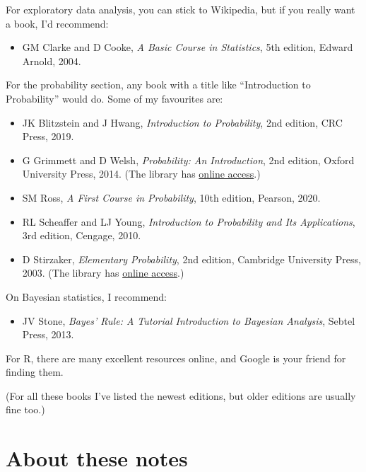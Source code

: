 \documentclass[
  a4paper,
]{book}
\providecommand{\tightlist}{%
  \setlength{\itemsep}{0pt}\setlength{\parskip}{0pt}}
\theoremstyle{definition}
\theoremstyle{definition}
\theoremstyle{definition}
\theoremstyle{remark}
\begin{document}
For exploratory data analysis, you can stick to Wikipedia, but if you really want a book, I'd recommend:

\begin{itemize}
\tightlist
\item
  GM Clarke and D Cooke, \emph{A Basic Course in Statistics}, 5th edition, Edward Arnold, 2004.
\end{itemize}

For the probability section, any book with a title like ``Introduction to Probability'' would do. Some of my favourites are:

\begin{itemize}
\tightlist
\item
  JK Blitzstein and J Hwang, \emph{Introduction to Probability}, 2nd edition, CRC Press, 2019.
\item
  G Grimmett and D Welsh, \emph{Probability: An Introduction}, 2nd edition, Oxford University Press, 2014. (The library has \href{https://leeds.primo.exlibrisgroup.com/permalink/44LEE_INST/13rlbcs/alma991002938669705181}{online access}.)
\item
  SM Ross, \emph{A First Course in Probability}, 10th edition, Pearson, 2020.
\item
  RL Scheaffer and LJ Young, \emph{Introduction to Probability and Its Applications}, 3rd edition, Cengage, 2010.
\item
  D Stirzaker, \emph{Elementary Probability}, 2nd edition, Cambridge University Press, 2003. (The library has \href{https://leeds.primo.exlibrisgroup.com/permalink/44LEE_INST/13rlbcs/alma991013131349705181}{online access}.)
\end{itemize}

On Bayesian statistics, I recommend:

\begin{itemize}
\tightlist
\item
  JV Stone, \emph{Bayes' Rule: A Tutorial Introduction to Bayesian Analysis}, Sebtel Press, 2013.
\end{itemize}

For R, there are many excellent resources online, and Google is your friend for finding them.

(For all these books I've listed the newest editions, but older editions are usually fine too.)

\hypertarget{about-notes}{%
\section*{About these notes}\label{about-notes}}
\end{document}
